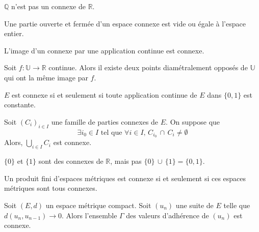   \begin{example}
    $\mathbb{Q}$ n'est pas un connexe de $\mathbb{R}$.
  \end{example}


  \begin{proposition}
    Une partie ouverte et fermée d'un espace connexe est vide ou égale à l'espace entier.
  \end{proposition}


  \begin{proposition}
    L'image d'un connexe par une application continue est connexe.
  \end{proposition}


  \begin{application}
    Soit $f : \mathbb{U} \rightarrow \mathbb{R}$ continue. Alors il existe deux points diamétralement opposés de $\mathbb{U}$ qui ont la même image par $f$.
  \end{application}


  \begin{corollary}
    $E$ est connexe si et seulement si toute application continue de $E$ dans $\{ 0, 1 \}$ est constante.
  \end{corollary}

  \begin{proposition}
    Soit $(C_i)_{i \in I}$ une famille de parties connexes de $E$. On suppose que
    \[ \exists i_0 \in I \text{ tel que } \forall i \in I, \, C_{i_0} \, \cap \, C_i \neq \emptyset \]
    Alors, $\bigcup_{i \in I} C_i$ est connexe.
  \end{proposition}

  \begin{cexample}
    $\{ 0 \}$ et $\{ 1 \}$ sont des connexes de $\mathbb{R}$, mais pas $\{ 0 \} \, \cup \, \{ 1 \} = \{ 0, 1 \}$.
  \end{cexample}

  \begin{proposition}
    Un produit fini d'espaces métriques est connexe si et seulement si ces espaces métriques sont tous connexes.
  \end{proposition}


  \begin{application}
    Soit $(E, d)$ un espace métrique compact. Soit $(u_n)$ une suite de $E$ telle que $d(u_n,u_{n-1}) \longrightarrow 0$. Alors l'ensemble $\Gamma$ des valeurs d'adhérence de $(u_n)$ est connexe.
  \end{application}

